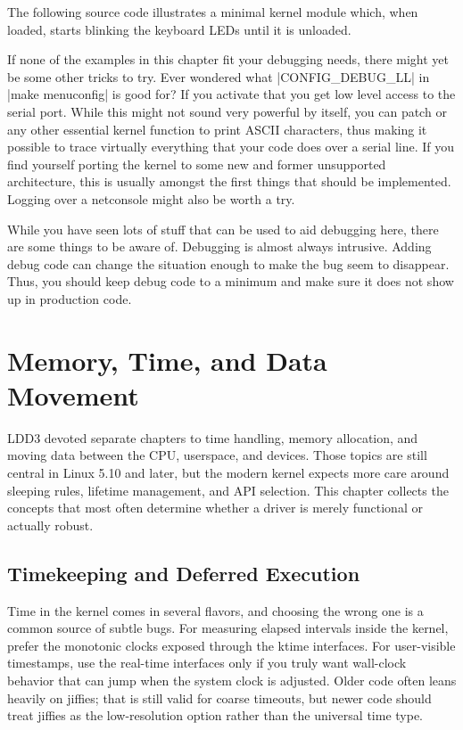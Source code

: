 \documentclass[10pt, oneside]{book}
\begin{document}
The following source code illustrates a minimal kernel module which, when loaded, starts blinking the keyboard LEDs until it is unloaded.


If none of the examples in this chapter fit your debugging needs, there might yet be some other tricks to try.
Ever wondered what \cpp|CONFIG_DEBUG_LL| in \sh|make menuconfig| is good for?
If you activate that you get low level access to the serial port.
While this might not sound very powerful by itself, you can patch  or any other essential kernel function to print ASCII characters, thus making it possible to trace virtually everything that your code does over a serial line.
If you find yourself porting the kernel to some new and former unsupported architecture, this is usually amongst the first things that should be implemented.
Logging over a netconsole might also be worth a try.

While you have seen lots of stuff that can be used to aid debugging here, there are some things to be aware of. Debugging is almost always intrusive.
Adding debug code can change the situation enough to make the bug seem to disappear.
Thus, you should keep debug code to a minimum and make sure it does not show up in production code.

\chapter{Memory, Time, and Data Movement}
LDD3 devoted separate chapters to time handling, memory allocation, and moving
data between the CPU, userspace, and devices.
Those topics are still central in Linux 5.10 and later, but the modern kernel expects more
care around sleeping rules, lifetime management, and API selection.
This chapter collects the concepts that most often determine whether a driver is
merely functional or actually robust.

\section{Timekeeping and Deferred Execution}
\label{sec:timekeeping}
Time in the kernel comes in several flavors, and choosing the wrong one is a
common source of subtle bugs.
For measuring elapsed intervals inside the kernel, prefer the monotonic clocks
exposed through the ktime interfaces.
For user-visible timestamps, use the real-time interfaces only if you truly want
wall-clock behavior that can jump when the system clock is adjusted.
Older code often leans heavily on jiffies; that is still valid for coarse
timeouts, but newer code should treat jiffies as the low-resolution option
rather than the universal time type.
\end{document}
